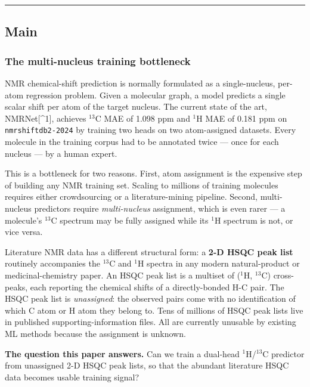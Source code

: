\begin{center}\rule{0.5\linewidth}{0.5pt}\end{center}

\subsection{Main}\label{main}

\subsubsection{The multi-nucleus training bottleneck}\label{the-multi-nucleus-training-bottleneck}

NMR chemical-shift prediction is normally formulated as a single-nucleus, per-atom regression problem. Given a molecular graph, a model predicts a single scalar shift per atom of the target nucleus. The current state of the art, NMRNet{[}\^{}1{]}, achieves \(^{13}\)C MAE of 1.098 ppm and \(^{1}\)H MAE of 0.181 ppm on \texttt{nmrshiftdb2-2024} by training two heads on two atom-assigned datasets. Every molecule in the training corpus had to be annotated twice --- once for each nucleus --- by a human expert.

This is a bottleneck for two reasons. First, atom assignment is the expensive step of building any NMR training set. Scaling to millions of training molecules requires either crowdsourcing or a literature-mining pipeline. Second, multi-nucleus predictors require \emph{multi-nucleus} assignment, which is even rarer --- a molecule's \(^{13}\)C spectrum may be fully assigned while its \(^{1}\)H spectrum is not, or vice versa.

Literature NMR data has a different structural form: a \textbf{2-D HSQC peak list} routinely accompanies the \(^{13}\)C and \(^{1}\)H spectra in any modern natural-product or medicinal-chemistry paper. An HSQC peak list is a multiset of (\(^{1}\)H, \(^{13}\)C) cross-peaks, each reporting the chemical shifts of a directly-bonded H-C pair. The HSQC peak list is \emph{unassigned}: the observed pairs come with no identification of which C atom or H atom they belong to. Tens of millions of HSQC peak lists live in published supporting-information files. All are currently unusable by existing ML methods because the assignment is unknown.

\textbf{The question this paper answers.} Can we train a dual-head \(^{1}\)H/\(^{13}\)C predictor from unassigned 2-D HSQC peak lists, so that the abundant literature HSQC data becomes usable training signal?

